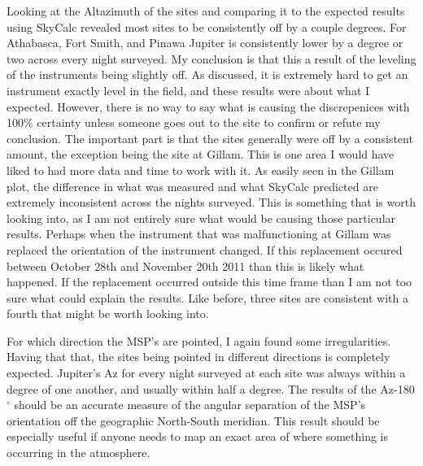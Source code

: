 \documentclass[11pt]{article}
\begin{document}
Looking at the Altazimuth of the sites and comparing it to the expected results using SkyCalc revealed most sites to be consistently off by a couple degrees. For Athabasca, Fort Smith, and Pinawa Jupiter is consistently lower by a degree or two across every night surveyed. My conclusion is that this a result of the leveling of the instruments being slightly off. As discussed, it is extremely hard to get an instrument exactly level in the field, and these results were about what I expected. However, there is no way to say what is causing the discrepenices with 100\% certainty unless someone goes out to the site to confirm or refute my conclusion. The important part is that the sites generally were off by a consistent amount, the exception being the site at Gillam. This is one area I would have liked to had more data and time to work with it. As easily seen in the Gillam plot, the difference in what was measured and what SkyCalc predicted are extremely inconsistent across the nights surveyed. This is something that is worth looking into, as I am not entirely sure what would be causing those particular results. Perhaps when the instrument that was malfunctioning at Gillam was replaced the orientation of the instrument changed. If this replacement occured between October 28th and November 20th 2011 than this is likely what happened. If the replacement occurred outside this time frame than I am not too sure what could explain the results. Like before, three sites are consistent with a fourth that might be worth looking into.

\indent For which direction the MSP's are pointed, I again found some irregularities. Having that that, the sites being pointed in different directions is completely expected. Jupiter's Az for every night surveyed at each site was always within a degree of one another, and usually within half a degree. The results of the Az-180$^\circ$ should be an accurate measure of the angular separation of the MSP's orientation off the geographic North-South meridian. This result should be especially useful if anyone needs to map an exact area of where something is occurring in the atmosphere.
\end{document}
